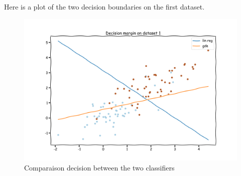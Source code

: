 \begin{answer}
  Here is a plot of the two decision boundaries on the first dataset.\\

  \begin{figure}[htpb]
    \centering
    \includegraphics[width=0.8\linewidth]{linearclass/com_gda_logreg_ds2.png}
    \caption{Comparaison decision between the two classifiers}%
    \label{fig:linearclass/com_gda_logreg_ds2}
  \end{figure}
\end{answer}
